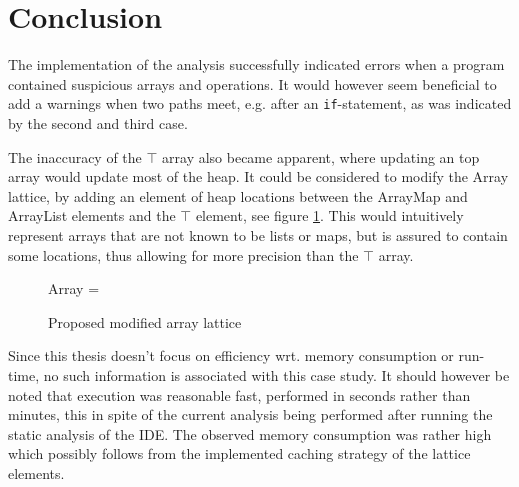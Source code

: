 \section{Conclusion}

The implementation of the analysis successfully indicated errors when a program contained suspicious arrays and operations. It would however seem beneficial to add a warnings when two paths meet, e.g. after an \texttt{if}-statement, as was indicated by the second and third case. 

The inaccuracy of the $\top$ array also became apparent, where updating an top array would update most of the heap. It could be considered to modify the Array lattice, by adding an element of heap locations between the ArrayMap and ArrayList elements and the $\top$ element, see figure \ref{fig:newArray}. This would intuitively represent arrays that are not known to be lists or maps, but is assured to contain some locations, thus allowing for more precision than the $\top$ array. 

\begin{figure}
\centering
Array = 
\caption{Proposed modified array lattice}
\label{fig:newArray}
\end{figure}

Since this thesis doesn't focus on efficiency wrt. memory consumption or run-time, no such information is associated with this case study. It should however be noted that execution was reasonable fast, performed in seconds rather than minutes, this in spite of the current analysis being performed after running the static analysis of the IDE. The observed memory consumption was rather high which possibly follows from the implemented caching strategy of the lattice elements.  
